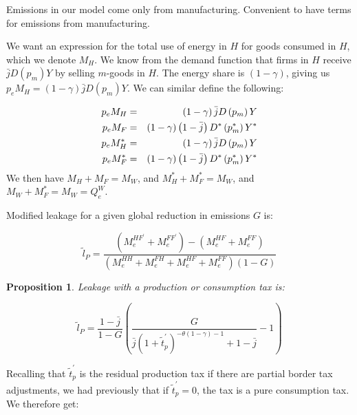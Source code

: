 \documentclass[notitlepage,12pt]{article}
\newtheorem{proposition}[theorem]{Proposition}
\begin{document}
Emissions in our model come only from manufacturing. Convenient to have
terms for emissions from manufacturing.

We want an expression for the total use of energy in $H$ for goods consumed
in $H$, which we denote $M_{H}$. We know from the demand function that firms
in $H$ receive $\bar{j}D\left( p_{m}\right) Y$ by selling $m$-goods in $H$.
The energy share is $\left( 1-\gamma \right) $, giving us $p_{e}M_{H}=\left(
1-\gamma \right) \bar{j}D\left( p_{m}\right) Y$. We can similar define the
following:

\begin{eqnarray}
p_{e}M_{H} &=&\left( 1-\gamma \right) \bar{j}D\left( p_{m}\right) Y  \notag
\\
p_{e}M_{F} &=&\left( 1-\gamma \right) \left( 1-\bar{j}\right) D^{\ast
}\left( p_{m}^{\ast }\right) Y^{\ast }  \notag \\
p_{e}M_{H}^{\ast } &=&\left( 1-\gamma \right) \bar{j}D\left( p_{m}\right) Y 
\notag \\
p_{e}M_{F}^{\ast } &=&\left( 1-\gamma \right) \left( 1-\bar{j}\right)
D^{\ast }\left( p_{m}^{\ast }\right) Y^{\ast }
\end{eqnarray}%
We then have $M_{H}+M_{F}=M_{W}$, and $M_{H}^{\ast }+M_{F}^{\ast }=M_{W}$,
and $M_{W}+M_{F}^{\ast }=M_{W}=Q_{e}^{W}$.

Modified leakage for a given global reduction in emissions $G$ is:\ 

\begin{equation*}
\tilde{l}_{P}=\frac{\left( M_{e}^{HF^{\prime }}+M_{e}^{FF^{\prime }}\right)
-\left( M_{e}^{HF}+M_{e}^{FF}\right) }{\left(
M_{e}^{HH}+M_{e}^{FH}+M_{e}^{HF}+M_{e}^{FF}\right) \left( 1-G\right) }
\end{equation*}

\begin{proposition}
Leakage with a production or consumption tax is:
\end{proposition}

\begin{equation*}
\tilde{l}_{P}=\frac{1-\bar{j}}{1-G}\left( \frac{G}{\bar{j}\left( 1+\tilde{t}%
_{p}^{\prime }\right) ^{-\theta \left( 1-\gamma \right) -1}+1-\bar{j}}%
-1\right)
\end{equation*}

Recalling that $\tilde{t}_{p}^{\prime }$ is the residual production tax if
there are partial border tax adjustments, we had previously that if $\tilde{t%
}_{p}^{\prime }=0$, the tax is a pure consumption tax. We therefore get:
\end{document}

